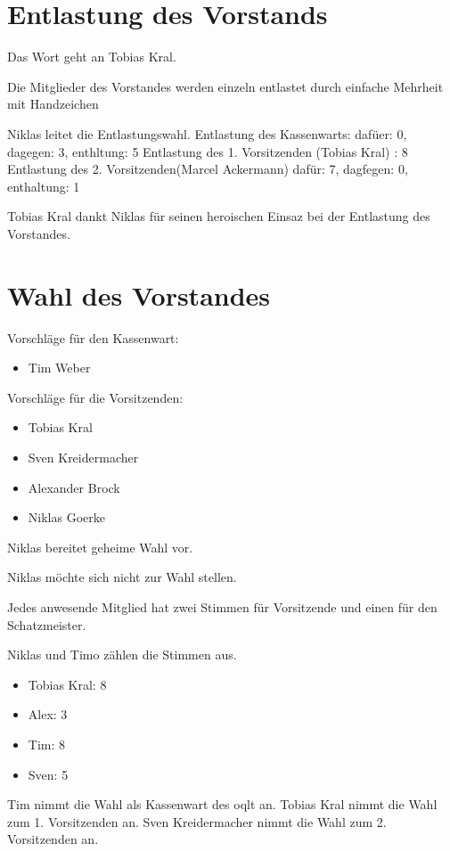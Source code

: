\documentclass[parskip]{scrartcl}
\begin{document}
\section{Entlastung des Vorstands}{

Das Wort geht an Tobias Kral.

Die Mitglieder des Vorstandes werden einzeln entlastet durch einfache Mehrheit mit Handzeichen

Niklas leitet die Entlastungswahl.
Entlastung des Kassenwarts: dafüer: 0, dagegen: 3, enthltung: 5
Entlastung des 1. Vorsitzenden (Tobias Kral) : 8 
Entlastung des 2. Vorsitzenden(Marcel Ackermann) dafür: 7, dagfegen: 0, enthaltung: 1

Tobias Kral dankt Niklas für seinen heroischen Einsaz bei der Entlastung des Vorstandes.

\section{Wahl des Vorstandes}

Vorschläge für den Kassenwart:
\begin{itemize}
\item{} Tim Weber
\end{itemize}

Vorschläge für die Vorsitzenden:
\begin{itemize}
\item{} Tobias Kral
\item{} Sven Kreidermacher
\item{} Alexander Brock
\item{} Niklas Goerke
\end{itemize}

Niklas bereitet geheime Wahl vor.

Niklas möchte sich nicht zur Wahl stellen.

Jedes anwesende Mitglied hat zwei Stimmen für Vorsitzende und einen für den Schatzmeister.

Niklas und Timo zählen die Stimmen aus.

\begin{itemize}
\item{} Tobias Kral: 8
\item{} Alex: 3
\item{} Tim:  8
\item{} Sven: 5
\end{itemize}


Tim nimmt die Wahl als Kassenwart des oqlt an.
Tobias Kral nimmt die Wahl zum 1. Vorsitzenden an.
Sven Kreidermacher nimmt die Wahl zum 2. Vorsitzenden an.

}
\end{document}
